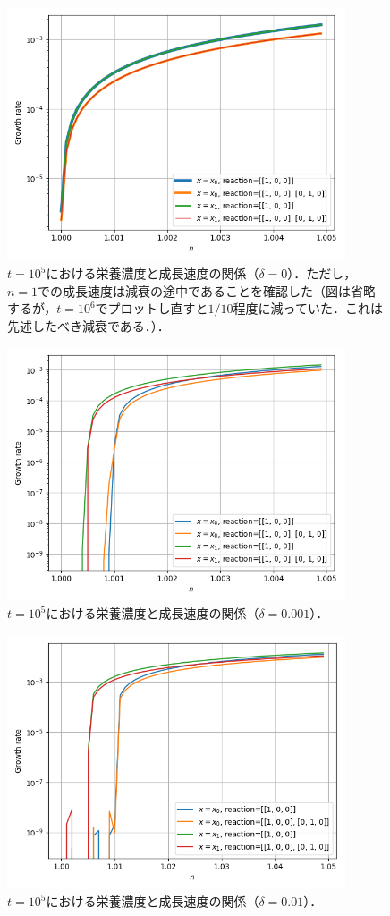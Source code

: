\documentclass[a4paper,11pt]{jsarticle}
\begin{document}
\begin{figure}[htbp]
  \centering
  \includegraphics[width=10cm]{waste_errslp0_s01_ng_focus.png}
  \caption{$t=10^5$における栄養濃度と成長速度の関係（$\delta=0$）．ただし，$n=1$での成長速度は減衰の途中であることを確認した（図は省略するが，$t=10^6$でプロットし直すと$1/10$程度に減っていた．これは先述したべき減衰である．）．}
  \label{fig:errslp0_ng}
\end{figure}

\begin{figure}[htbp]
  \centering
  \includegraphics[width=10cm]{waste_errslp0001_s01_ng_focus.png}
  \caption{$t=10^5$における栄養濃度と成長速度の関係（$\delta=0.001$）．}
  \label{fig:errslp0001_ng}
\end{figure}

\begin{figure}[htbp]
  \centering
  \includegraphics[width=10cm]{waste_errslp001_s01_ng_focus.png}
  \caption{$t=10^5$における栄養濃度と成長速度の関係（$\delta=0.01$）．}
  \label{fig:errslp001_ng}
\end{figure}
\end{document}
